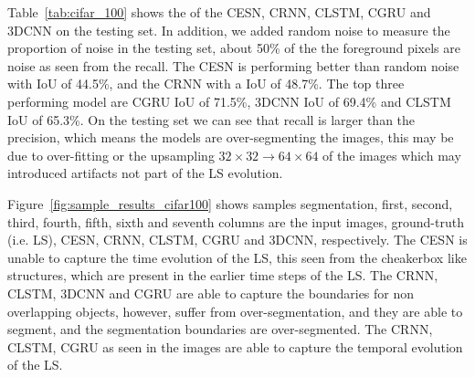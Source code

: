 \documentclass{WitsPhysicsReport}
\begin{document}
Table~\ref{tab:cifar_100} shows the of the CESN, CRNN, CLSTM, CGRU and 3DCNN on the testing set. In addition, we added random noise to measure the proportion of noise in the testing set, about 50\% of the the foreground pixels are noise as seen from the recall. The CESN is performing better than random noise with IoU of 44.5\%, and the CRNN with a IoU of 48.7\%. The top three performing model are CGRU IoU of 71.5\%, 3DCNN IoU of 69.4\% and CLSTM IoU of 65.3\%. On the testing set we can see that recall is larger than the precision, which means the models are over-segmenting the images, this may be due to over-fitting or the upsampling $32\times32 \rightarrow 64\times64$ of the images which may introduced artifacts not part of the LS evolution.


\begin{table}[H]
 \centering
 \caption{CIFAR-100 testing results. Here we compare various models and noise is also included.}
    \label{tab:cifar_100}
\end{table}


Figure~\ref{fig:sample_results_cifar100} shows samples segmentation, first, second, third, fourth, fifth, sixth and seventh columns are the input images, ground-truth (i.e. LS), CESN, CRNN, CLSTM, CGRU and 3DCNN, respectively. The CESN is unable to capture the time evolution of the LS, this seen from the cheakerbox like structures, which are present in the earlier time steps of the LS. The CRNN, CLSTM, 3DCNN and CGRU are able to capture the boundaries for non overlapping objects, however, suffer from over-segmentation, and they are able to segment, and the segmentation boundaries are over-segmented. The CRNN, CLSTM, CGRU as seen in the images are able to capture the temporal evolution of the LS.
\end{document}
